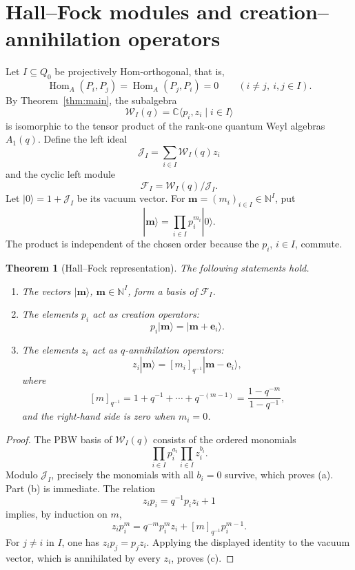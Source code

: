 \documentclass[12pt]{article}
\newcommand{\Hom}{\operatorname{Hom}}
\theoremstyle{plain}
\newtheorem{theorem}{Theorem}[section]
\theoremstyle{remark}
\begin{document}
\section{Hall--Fock modules and creation--annihilation operators}

Let $I\subseteq Q_0$ be projectively Hom-orthogonal, that is,
\[
 \Hom_A(P_i,P_j)=\Hom_A(P_j,P_i)=0
 \qquad(i\ne j,\ i,j\in I).
\]
By Theorem~\ref{thm:main}, the subalgebra
\[
 \mathcal W_I(q)=\mathbb C\langle p_i,z_i\mid i\in I\rangle
\]
is isomorphic to the tensor product of the rank-one quantum Weyl algebras
$A_1(q)$. Define the left ideal
\[
 \mathcal J_I=\sum_{i\in I}\mathcal W_I(q)z_i
\]
and the cyclic left module
\[
 \mathcal F_I=\mathcal W_I(q)/\mathcal J_I.
\]
Let $|0\rangle=1+\mathcal J_I$ be its vacuum vector. For
$\mathbf m=(m_i)_{i\in I}\in\mathbb N^I$, put
\[
 |\mathbf m\rangle=\prod_{i\in I}p_i^{m_i}|0\rangle.
\]
The product is independent of the chosen order because the $p_i$, $i\in I$,
commute.

\begin{theorem}[Hall--Fock representation]\label{thm:fock}
The following statements hold.
\begin{enumerate}[label=\rm(\alph*)]
\item The vectors $|\mathbf m\rangle$, $\mathbf m\in\mathbb N^I$, form a
basis of $\mathcal F_I$.
\item The elements $p_i$ act as creation operators:
\[
 p_i|\mathbf m\rangle=|\mathbf m+\mathbf e_i\rangle.
\]
\item The elements $z_i$ act as $q$-annihilation operators:
\[
 z_i|\mathbf m\rangle
 =[m_i]_{q^{-1}}|\mathbf m-\mathbf e_i\rangle,
\]
where
\[
 [m]_{q^{-1}}=1+q^{-1}+\cdots+q^{-(m-1)}
 =\frac{1-q^{-m}}{1-q^{-1}},
\]
and the right-hand side is zero when $m_i=0$.
\end{enumerate}
\end{theorem}

\begin{proof}
The PBW basis of $\mathcal W_I(q)$ consists of the ordered monomials
\[
 \prod_{i\in I}p_i^{a_i}\prod_{i\in I}z_i^{b_i}.
\]
Modulo $\mathcal J_I$, precisely the monomials with all $b_i=0$ survive,
which proves (a). Part (b) is immediate. The relation
\[
 z_ip_i=q^{-1}p_iz_i+1
\]
implies, by induction on $m$,
\[
 z_ip_i^m=q^{-m}p_i^mz_i+[m]_{q^{-1}}p_i^{m-1}.
\]
For $j\ne i$ in $I$, one has $z_ip_j=p_jz_i$. Applying the displayed
identity to the vacuum vector, which is annihilated by every $z_i$, proves
(c).
\end{proof}
\end{document}
